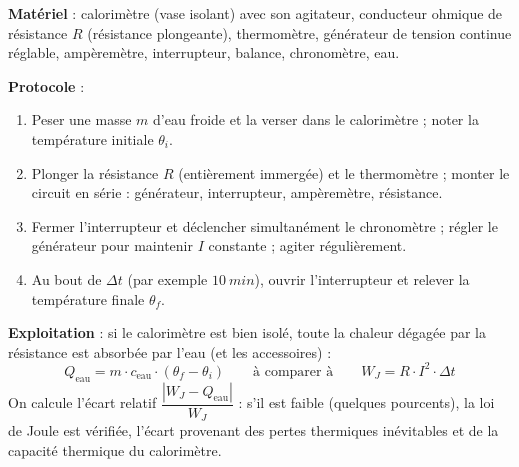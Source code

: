 \documentclass[11pt]{article}
\begin{document}
\begin{experience}
\textbf{Matériel} : calorimètre (vase isolant) avec son agitateur, conducteur ohmique de résistance $R$ (résistance plongeante), thermomètre, générateur de tension continue réglable, ampèremètre, interrupteur, balance, chronomètre, eau.

\textbf{Protocole} :
\begin{enumerate}
\item Peser une masse $m$ d'eau froide et la verser dans le calorimètre ; noter la température initiale $\theta_i$.
\item Plonger la résistance $R$ (entièrement immergée) et le thermomètre ; monter le circuit en série : générateur, interrupteur, ampèremètre, résistance.
\item Fermer l'interrupteur et déclencher simultanément le chronomètre ; régler le générateur pour maintenir $I$ constante ; agiter régulièrement.
\item Au bout de $\Delta t$ (par exemple $\SI{10}{min}$), ouvrir l'interrupteur et relever la température finale $\theta_f$.
\end{enumerate}

\textbf{Exploitation} : si le calorimètre est bien isolé, toute la chaleur dégagée par la résistance est absorbée par l'eau (et les accessoires) :
\[ Q_{\text{eau}} = m \cdot c_{\text{eau}} \cdot (\theta_f - \theta_i) \qquad \text{à comparer à} \qquad W_J = R \cdot I^2 \cdot \Delta t \]
On calcule l'écart relatif $\dfrac{|W_J - Q_{\text{eau}}|}{W_J}$ : s'il est faible (quelques pourcents), la loi de Joule est vérifiée, l'écart provenant des pertes thermiques inévitables et de la capacité thermique du calorimètre.
\end{experience}
\end{document}
